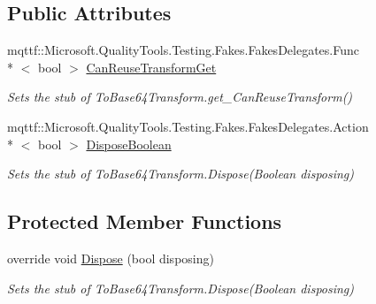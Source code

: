 \subsection*{Public Attributes}
\begin{DoxyCompactItemize}
\item 
mqttf\-::\-Microsoft.\-Quality\-Tools.\-Testing.\-Fakes.\-Fakes\-Delegates.\-Func\\*
$<$ bool $>$ \hyperlink{class_system_1_1_security_1_1_cryptography_1_1_fakes_1_1_stub_to_base64_transform_aa34e057e5fb9cb4e4750ffa65c87b710}{Can\-Reuse\-Transform\-Get}
\begin{DoxyCompactList}\small\item\em Sets the stub of To\-Base64\-Transform.\-get\-\_\-\-Can\-Reuse\-Transform()\end{DoxyCompactList}\item 
mqttf\-::\-Microsoft.\-Quality\-Tools.\-Testing.\-Fakes.\-Fakes\-Delegates.\-Action\\*
$<$ bool $>$ \hyperlink{class_system_1_1_security_1_1_cryptography_1_1_fakes_1_1_stub_to_base64_transform_afc2a3974c34681ef69514342b22b177f}{Dispose\-Boolean}
\begin{DoxyCompactList}\small\item\em Sets the stub of To\-Base64\-Transform.\-Dispose(\-Boolean disposing)\end{DoxyCompactList}\end{DoxyCompactItemize}
\subsection*{Protected Member Functions}
\begin{DoxyCompactItemize}
\item 
override void \hyperlink{class_system_1_1_security_1_1_cryptography_1_1_fakes_1_1_stub_to_base64_transform_a23d6129e3d12069de1c927a7200738b4}{Dispose} (bool disposing)
\begin{DoxyCompactList}\small\item\em Sets the stub of To\-Base64\-Transform.\-Dispose(\-Boolean disposing)\end{DoxyCompactList}\end{DoxyCompactItemize}
